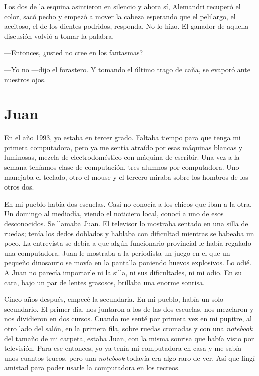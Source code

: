 \documentclass[11pt,twoside,openright]{book}
\begin{document}
 Los dos de la esquina asintieron en silencio y ahora sí,
 Alemandri recuperó el color, sacó pecho y empezó a mover la cabeza
 esperando que el pelilargo, el aceitoso, el de los dientes podridos,
 responda. No lo hizo. El ganador de aquella discusión volvió a tomar la
 palabra. 
 
 ---Entonces, ¿usted no cree en los fantasmas?
 
 ---Yo no ---dijo el forastero. Y tomando el último trago de caña, se evaporó
 ante nuestros ojos.
 
 


\chapter*{Juan}  
 En el año 1993, yo estaba en tercer grado. Faltaba tiempo para que tenga mi
 primera computadora, pero ya me sentía atraído por esas máquinas blancas y
 luminosas, mezcla de electrodoméstico con máquina de escribir. Una vez a la
 semana teníamos clase de computación, tres alumnos por computadora. Uno
 manejaba el teclado, otro el mouse y el tercero miraba sobre los hombros de los
 otros dos.
 
 En mi pueblo había dos escuelas. Casi no conocía a los chicos que iban a la
 otra. Un domingo al mediodía, viendo el noticiero local, conocí a uno de esos
 desconocidos. Se llamaba Juan. El televisor lo mostraba sentado en una silla de
 ruedas; tenía los dedos doblados y hablaba con dificultad mientras se babeaba
 un poco. La entrevista se debía a que algún funcionario provincial le había
 regalado una computadora. Juan le mostraba a la periodista un juego en el que
 un pequeño dinosaurio se movía en la pantalla poniendo huevos explosivos. Lo
 odié. A Juan no parecía importarle ni la silla, ni sus dificultades, ni mi
 odio. En su cara, bajo un par de lentes grasosos, brillaba una enorme sonrisa.
 
 Cinco años después, empecé la secundaria. En mi pueblo, había un solo
 secundario. El primer día, nos juntaron a los de las dos escuelas, nos
 mezclaron y nos dividieron en dos cursos. Cuando me senté por primera vez en mi
 pupitre, al otro lado del salón, en la primera fila, sobre ruedas cromadas y
 con una \emph{notebook} del tamaño de mi carpeta, estaba Juan, con la misma
 sonrisa que había visto por televisión. Para ese entonces, yo ya tenía mi
 computadora en casa y me sabía unos cuantos trucos, pero una \emph{notebook}
 todavía era algo raro de ver. Así que fingí amistad para poder usarle la
 computadora en los recreos.
 
\end{document}
